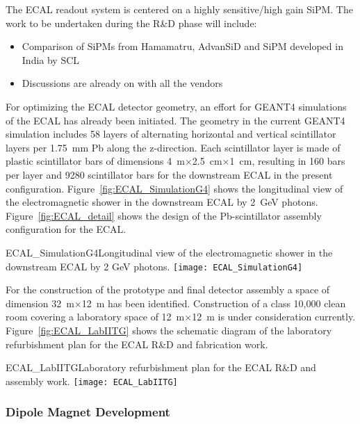 The ECAL readout system is centered on a highly sensitive/high gain SiPM. The work to be undertaken
during the R\&D phase will include:
\begin{itemize}
\item Comparison of SiPMs from Hamamatru, AdvanSiD and SiPM developed in India by SCL
\item Discussions are already on with all the vendors
\end{itemize}

For optimizing the ECAL detector geometry, an effort for GEANT4
simulations of the ECAL has already been initiated. The geometry in
the current GEANT4 simulation includes 58 layers of alternating
horizontal and vertical scintillator layers per 1.75~mm Pb along the
z-direction. Each scintillator layer is made of plastic scintillator
bars of dimensions 4~m$\times$2.5~cm$\times$1~cm, resulting in 160
bars per layer and 9280 scintillator bars for the downstream ECAL in
the present configuration.  Figure~\ref{fig:ECAL_SimulationG4} shows
the longitudinal view of the electromagnetic shower in the downstream
ECAL by 2~GeV photons. Figure~\ref{fig:ECAL_detail} shows the design
of the Pb-scintillator assembly configuration for the ECAL.
\begin{cdrfigure}
{ECAL_SimulationG4}{Longitudinal view of the electromagnetic shower in
the downstream ECAL by 2 GeV photons.}
\texttt{[image: ECAL\_SimulationG4]}
\end{cdrfigure}

For the construction of the prototype and final detector assembly a
space of dimension 32~m$\times$12~m has been
identified. Construction of a class 10,000 clean room covering a
laboratory space of 12~m$\times$12~m is under consideration
currently. Figure~\ref{fig:ECAL_LabIITG} shows the schematic diagram
of the laboratory refurbishment plan for the ECAL R\&D and fabrication
work.
\begin{cdrfigure}
{ECAL_LabIITG}{Laboratory refurbishment plan for the ECAL R\&D and assembly work.}
\texttt{[image: ECAL\_LabIITG]}
\end{cdrfigure}


\subsubsection{Dipole Magnet Development}


